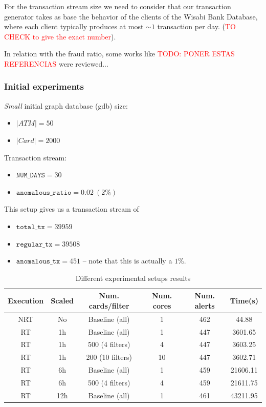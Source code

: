 For the transaction stream size we need to consider that our transaction generator takes as base the behavior of the clients of the 
Wisabi Bank Database, where each client typically produces at most $\sim 1$ transaction per day. (\textcolor{red}{TO CHECK to give the exact number}).

In relation with the fraud ratio, some works like \textcolor{red}{TODO: PONER ESTAS REFERENCIAS} were reviewed...

\subsubsection{Initial experiments}

\textit{Small} initial graph database (gdb) size:
\begin{itemize}
  \item $|ATM| = 50$
  \item $|Card| = 2000$
\end{itemize}

Transaction stream:
\begin{itemize}
  \item $\texttt{NUM\_DAYS} = 30$
  \item $\texttt{anomalous\_ratio} = 0.02\ (2\%)$ 
\end{itemize}

This setup gives us a transaction stream of 
\begin{itemize}
  \item $\texttt{total\_tx} = 39959$
  \item $\texttt{regular\_tx} = 39508$
  \item $\texttt{anomalous\_tx} = 451$ -- note that this is actually a $1\%$.
\end{itemize}

\begin{table}[H]
\centering
\begin{tabular}{|c|c|c|c|c|c|}
  \hline
  Execution & Scaled   & Num. cards/filter& Num. cores & Num. alerts & Time(s) \\ \hline
  NRT & No & Baseline (all) & 1 & 462 & 44.88 \\ \hline
  RT  & 1h & Baseline (all) & 1 & 447 & 3601.65\\ \hline
  RT  & 1h & 500 (4 filters) & 4 & 447 & 3603.25\\ \hline
  RT  & 1h & 200 (10 filters) & 10 & 447 & 3602.71\\ \hline
  RT  & 6h & Baseline (all) & 1 & 459 & 21606.11 \\ \hline
  RT  & 6h & 500 (4 filters) & 4 & 459 & 21611.75 \\ \hline
  RT  & 12h & Baseline (all) & 1 & 461 & 43211.95 \\ \hline
\end{tabular}
\caption{Different experimental setups results}
\label{table:small-results}
\end{table}

